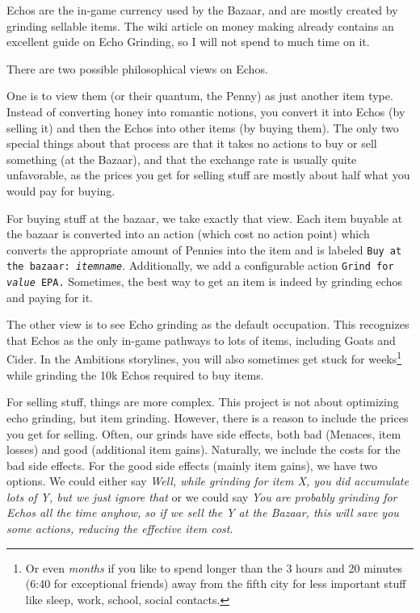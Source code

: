 \documentclass[a4paper,11pt,openright,twoside]{scrartcl}
\begin{document}
Echos are the in-game currency used by the Bazaar, and are mostly created by grinding sellable items. The wiki article on money making already contains an excellent guide on Echo Grinding, so I will not spend to much time on it.

There are two possible philosophical views on Echos.

One is to view them (or their quantum, the Penny) as just another item type. Instead of converting honey into romantic notions, you convert it into Echos (by selling it) and then the Echos into other items (by buying them). The only two special things about that process are that it takes no actions to buy or sell something (at the Bazaar), and that the exchange rate is usually quite unfavorable, as the prices you get for selling stuff are mostly about half what you would pay for buying.

For buying stuff at the bazaar, we take exactly that view. Each item buyable at the bazaar is converted into an action (which cost no action point) which converts the appropriate amount of Pennies into the item and is labeled \texttt{Buy at the bazaar: \textit{itemname}}. Additionally, we add a configurable action \texttt{Grind for \textit{value} EPA.} Sometimes, the best way to get an item is indeed by grinding echos and paying for it. 

The other view is to see Echo grinding as the default occupation. This recognizes that Echos as the only in-game pathways to lots of items, including Goats and Cider. In the Ambitions storylines, you will also sometimes get stuck for weeks\footnote{Or even \emph{months} if you like to spend longer than the 3 hours and 20 minutes (6:40 for exceptional friends) away from the fifth city for less important stuff like sleep, work, school, social contacts.} while grinding the 10k Echos required to buy items. 

For selling stuff, things are more complex. This project is not about optimizing echo grinding, but item grinding. However, there is a reason to include the prices you get for selling. Often, our grinds have side effects, both bad (Menaces, item losses) and good (additional item gains). Naturally, we include the costs for the bad side effects. For the good side effects (mainly item gains), we have two options. We could either say \emph{Well, while grinding for item X, you did accumulate lots of Y, but we just ignore that} or we could say \emph{You are probably grinding for Echos all the time anyhow, so if we sell the Y at the Bazaar, this will save you some actions, reducing the effective item cost}.
\end{document}
